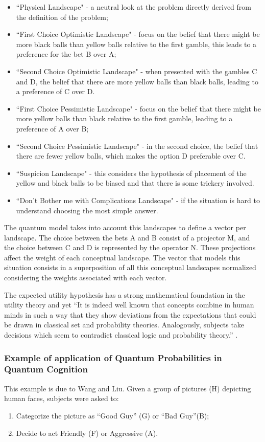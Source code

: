\begin{itemize}
\item ``Physical Landscape" - a neutral look at the problem directly derived 
from the definition of the problem;
\item ``First Choice Optimistic Landscape" - focus on the belief that there 
might be more black balls than yellow balls relative to the first gamble, 
this leads to a preference for the bet B over A;
\item ``Second Choice Optimistic Landscape" - when presented with the gambles 
C and D, the belief that there are more yellow balls than black balls, 
leading to a preference of C over D.
\item ``First Choice Pessimistic Landscape" - focus on the belief that there 
might be more yellow balls than black relative to the first gamble, leading 
to a preference of A over B;
\item ``Second Choice Pessimistic Landscape" - in the second choice, the 
belief that there are fewer yellow balls, which makes the option D 
preferable over C. 
\item ``Suspicion Landscape" - this considers the hypothesis of placement of 
the yellow and black balls to be biased and that there is some trickery 
involved.
\item ``Don't Bother me with Complications Landscape" - if the situation is 
hard to understand choosing the most simple answer.
\end{itemize}

The quantum model takes into account this landscapes to define a vector per 
landscape. The choice between the bets A and B consist of a projector M, and 
the choice between C and D is represented by the operator N. These 
projections affect the weight of each conceptual landscape. The vector that models this 
situation consists in a superposition of all this conceptual landscapes 
normalized considering the weights associated with each vector.

The expected utility hypothesis has a strong mathematical foundation in the utility theory and yet ``It is indeed well known that concepts combine in human minds in such a way that they show deviations from the expectations that could be drawn in classical set and probability theories. Analogously, subjects take decisions which seem to
contradict classical logic and probability theory.'' \cite[Aerts et al]{Aerts2011}. 

\subsubsection{Example of application of Quantum Probabilities in Quantum Cognition}
This example is due to Wang and Liu\cite{Wang2007}\cite{Busemeyer2011}\cite{Busemeyer2009423}. Given a group of pictures (H) depicting human faces, subjects were asked to:
\begin{enumerate}
\item Categorize the picture as ``Good Guy'' (G) or ``Bad Guy''(B);
\item Decide to act Friendly (F) or Aggressive (A).
\end{enumerate} 

